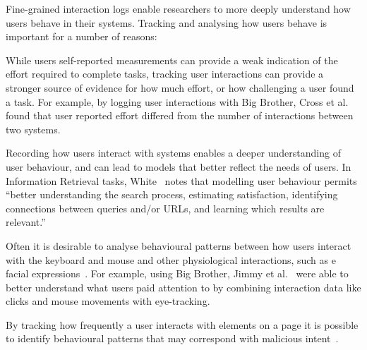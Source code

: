 
Fine-grained interaction logs enable researchers to more deeply understand how users behave in their systems. Tracking and analysing how users behave is important for a number of reasons:

\begin{description}[noitemsep,leftmargin=8pt]
	\item[Evaluation.] While users self-reported measurements can provide a weak indication of the effort required to complete tasks, tracking user interactions can provide a stronger source of evidence for how much effort, or how challenging a user found a task. For example, by logging user interactions with Big Brother, Cross et al.~\cite{cross2021search} found that user reported effort differed from the number of interactions between two systems.
	\item[User Modelling.] Recording how users interact with systems enables a deeper understanding of user behaviour, and can lead to models that better reflect the needs of users. In Information Retrieval tasks, White~\cite{white2016interactions} notes that modelling user behaviour permits ``better understanding the search process, estimating satisfaction, identifying connections between queries and/or URLs, and learning which results are relevant.''
	\item[Multi-Modal Interactions.] Often it is desirable to analyse behavioural patterns between how users interact with the keyboard and mouse and other physiological interactions, such as e facial expressions~\cite{arapakis2008affective}. For example, using Big Brother, Jimmy et al.~\cite{jimmy2020health} were able to better understand what users paid attention to by combining interaction data like clicks and mouse movements with eye-tracking.
	\item[Malicious Users.] By tracking how frequently a user interacts with elements on a page it is possible to identify behavioural patterns that may correspond with malicious intent~\cite{gadiraju2015understanding}. %
\end{description}